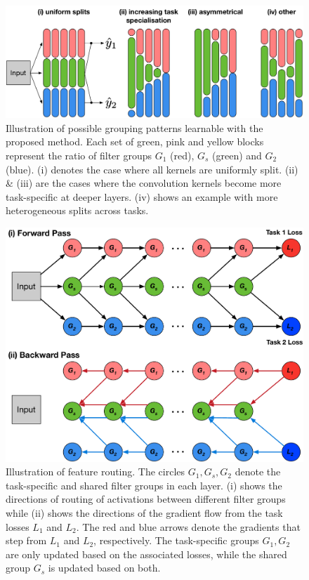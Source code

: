 \begin{figure}[ht]
	\center
	\includegraphics[width=0.9\linewidth]{chapter_6/figures/example_nets_03.pdf}
	\caption{\small Illustration of possible grouping patterns learnable with the proposed method. Each set of green, pink and yellow blocks represent the ratio of filter groups $G_1$ (red), $G_{s}$ (green) and $G_{2}$ (blue). (i) denotes the case where all kernels are uniformly split. (ii) \& (iii) are the cases where the convolution kernels become more task-specific at deeper layers. (iv) shows an example with more heterogeneous splits across tasks.}
    \label{fig:different_grouping}
\end{figure}

\begin{figure}[ht]
	\center
	\includegraphics[width=0.8\linewidth]{chapter_6/figures/forward_and_backward.pdf}
	\caption{\small Illustration of feature routing. The circles $G_{1}, G_{s}, G_{2}$ denote the task-specific and shared filter groups in each layer. (i) shows the directions of routing of activations between different filter groups while (ii) shows the directions of the gradient flow from the task losses $L_{1}$ and $L_{2}$. The red and blue arrows denote the gradients that step from $L_{1}$ and $L_{2}$, respectively. The task-specific groups $G_{1}, G_{2}$ are only updated based on the associated losses, while the shared group $G_{s}$ is updated based on both. }
    \label{fig:forward_and_backward}
\end{figure}

